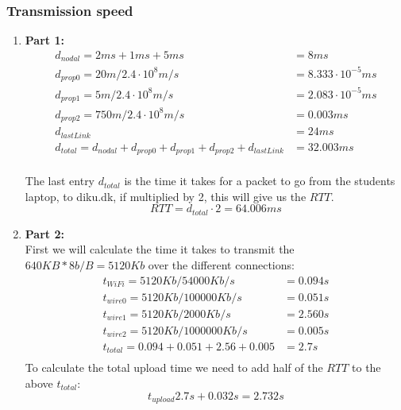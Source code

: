\documentclass[10pt]{article}
\begin{document}
\subsubsection{Transmission speed}
\begin{enumerate}
    \item \textbf{Part 1:}\\
    \begin{align*}
        d_{nodal} = 2ms + 1ms + 5ms      &= 8ms\\
        d_{prop0} = 20m/2.4\cdot10^8m/s  &= 8.333\cdot 10^{-5}ms\\
        d_{prop1} = 5m/2.4\cdot10^8m/s   &= 2.083\cdot 10^{-5}ms\\
        d_{prop2} = 750m/2.4\cdot10^8m/s &= 0.003ms\\
        d_{lastLink} &= 24ms\\
        d_{total} = d_{nodal} + d_{prop0} + d_{prop1} + d_{prop2} + d_{lastLink} &= 32.003ms\\
    \end{align*}

    The last entry $d_{total}$ is the time it takes for a packet to go from the
    students laptop, to diku.dk, if multiplied by 2, this will give us the
    $RTT$.
    \[
        RTT = d_{total} \cdot 2 = 64.006ms
    \]

    \item \textbf{Part 2:}\\
    First we will calculate the time it takes to transmit the $640KB*8b/B=5120Kb$
    over the different connections:
    \begin{align*}
        t_{WiFi}  = 5120Kb/54000Kb/s             &= 0.094s\\
        t_{wire0} = 5120Kb/100000Kb/s            &= 0.051s\\
        t_{wire1} = 5120Kb/2000Kb/s              &= 2.560s\\
        t_{wire2} = 5120Kb/1000000Kb/s           &= 0.005s\\
        t_{total} = 0.094 + 0.051 + 2.56 + 0.005 &= 2.7s\\
    \end{align*}
    To calculate the total upload time we need to add half of the $RTT$ to the
    above $t_{total}$:
    \[
        t_{upload}2.7s + 0.032s = 2.732s
    \]
\end{enumerate}
\end{document}
